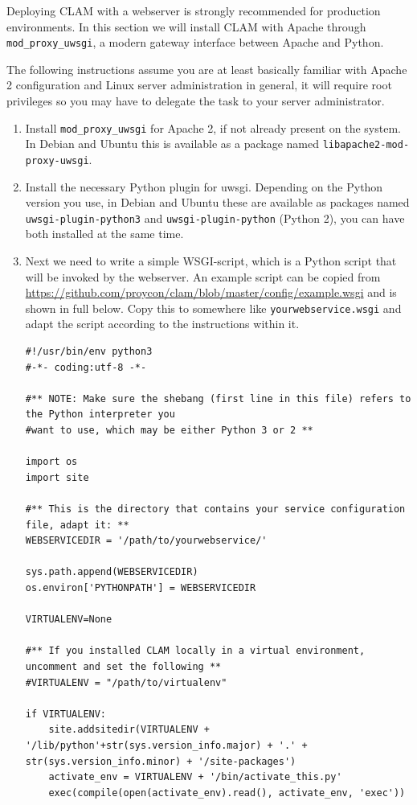 \documentclass[a4paper,12pt,twoside,openright]{report}
\begin{document}
Deploying CLAM with a webserver is strongly recommended for production
environments. In this section we will install CLAM with Apache through
\texttt{mod\_proxy\_uwsgi}, a modern gateway interface between Apache and
Python.  

The following instructions assume you are at least
basically familiar with Apache 2 configuration and Linux server administration
in general, it will require root privileges so you may have to delegate the
task to your server administrator.

\begin{enumerate}[leftmargin=5mm]
\item Install \texttt{mod\_proxy\_uwsgi} for Apache 2, if not already
present on the system. In Debian and Ubuntu this is available as a package
named \texttt{libapache2-mod-proxy-uwsgi}.
\item Install the necessary Python plugin for uwsgi. Depending on the Python
    version you use, in Debian and Ubuntu these are available as packages
    named \texttt{uwsgi-plugin-python3} and \texttt{uwsgi-plugin-python}
    (Python 2), you can have both installed at the same time.
\item Next we need to write a simple
WSGI-script, which is a Python script that will be invoked by the
webserver. An example script can be copied from
\url{https://github.com/proycon/clam/blob/master/config/example.wsgi} and
is shown in full below. Copy this to somewhere like
\texttt{yourwebservice.wsgi} and adapt the script according to the instructions
within it.

{ \small
\begin{verbatim}
#!/usr/bin/env python3
#-*- coding:utf-8 -*-

#** NOTE: Make sure the shebang (first line in this file) refers to the Python interpreter you
#want to use, which may be either Python 3 or 2 **

import os
import site

#** This is the directory that contains your service configuration file, adapt it: **
WEBSERVICEDIR = '/path/to/yourwebservice/'

sys.path.append(WEBSERVICEDIR)
os.environ['PYTHONPATH'] = WEBSERVICEDIR

VIRTUALENV=None

#** If you installed CLAM locally in a virtual environment, uncomment and set the following **
#VIRTUALENV = "/path/to/virtualenv"

if VIRTUALENV:
    site.addsitedir(VIRTUALENV + '/lib/python'+str(sys.version_info.major) + '.' + str(sys.version_info.minor) + '/site-packages')
    activate_env = VIRTUALENV + '/bin/activate_this.py'
    exec(compile(open(activate_env).read(), activate_env, 'exec'))


\end{verbatim}}
\end{enumerate}
\end{document}
